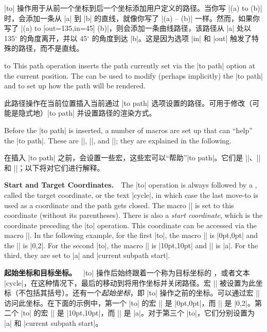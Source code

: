 |to| 操作用于从前一个坐标到后一个坐标添加用户定义的路径。当你写 |(a) to (b)| 时，会添加一条从 |a| 到 |b| 的直线，就像你写了 |(a) -- (b)| 一样。然而，如果你写了 |(a) to [out=135,in=45] (b)|，则会添加一条曲线路径，该路径从 |a| 处以 135$^\circ$ 的角度离开，并以 45$^\circ$ 的角度到达 |b|。这是因为选项 |in| 和 |out| 触发了特殊的路径，而不是直线。



\begin{pathoperation}{to}{
         }
    This path operation inserts the path currently set via the |to path| option
    at the current position. The  can be used to modify (perhaps
    implicitly) the |to path| and to set up how the path will be rendered.

    此路径操作在当前位置插入当前通过 |to path| 选项设置的路径。可用于修改（可能是隐式地）|to path| 并设置路径的渲染方式。


    Before the |to path| is inserted, a number of macros are set up that can
    ``help'' the |to path|. These are |\tikztostart|, |\tikztotarget|, and
    |\tikztonodes|; they are explained in the following.

    在插入 |to path| 之前，会设置一些宏，这些宏可以“帮助”|to path|。它们是 |\tikztostart|、|\tikztotarget| 和 |\tikztonodes|；以下将对它们进行解释。


    \medskip
    \textbf{Start and Target Coordinates.}\ \
    The |to| operation is always followed by a , called the
    target coordinate, or the text |cycle|, in which case the last move-to is
    used as a coordinate and the path gets closed. The macro |\tikztotarget| is
    set to this coordinate (without its parentheses). There is also a
    \emph{start coordinate}, which is the coordinate preceding the |to|
    operation. This coordinate can be accessed via the macro |\tikztostart|. In
    the following example, for the first |to|, the macro |\tikztostart| is
    |0pt,0pt| and the |\tikztotarget| is |0,2|. For the second |to|, the macro
    |\tikztostart| is |10pt,10pt| and |\tikztotarget| is |a|. For the third,
    they are set to |a| and |current subpath start|.

    \textbf{起始坐标和目标坐标。}\ \
|to| 操作后始终跟着一个称为目标坐标的 ，或者文本 |cycle|，在这种情况下，最后的移动到将用作坐标并关闭路径。宏 |\tikztotarget| 被设置为此坐标（不包括其括号）。还有一个\emph{起始坐标}，即 |to| 操作之前的坐标。可以通过宏 |\tikztostart| 访问此坐标。在下面的示例中，第一个 |to| 的宏 |\tikztostart| 是 |0pt,0pt|，而 |\tikztotarget| 是 |0,2|。第二个 |to| 的宏 |\tikztostart| 是 |10pt,10pt|，而 |\tikztotarget| 是 |a|。对于第三个 |to|，它们分别设置为 |a| 和 |current subpath start|。


\end{pathoperation}
